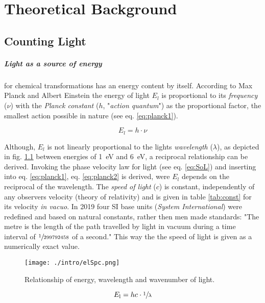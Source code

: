 \chapter{Theoretical Background}
	\section{Counting Light}
	\paragraph{Light as a source of energy} for chemical transformations has an energy content by itself. According to Max Planck and Albert Einstein the energy of light $E_l$ is proportional to its \emph{frequency} ($\nu$) with the \emph{Planck constant} ($h$, "\emph{action quantum}") as the proportional factor, the smallest action possible in nature (see eq. \ref{eq:planck1}). 

	\begin{equation}%
		\label{eq:planck1}
		E_l = h\cdot\nu
	\end{equation}

	Although, $E_l$ is not linearly proportional to the lights \emph{wavelength} ($\lambda$), as depicted in fig. \ref{fig:elSpc} between energies of \qty{1}{\eV} and \qty{6}{\eV}, a reciprocal relationship can be derived. Invoking the phase velocity law for light (see eq. \ref{eq:SoL}) and inserting into eq. \ref{eq:planck1}, eq. \ref{eq:planck2} is derived, were  $E_l$ depends on the reciprocal of the wavelength. The \emph{speed of light} ($c$) is constant, independently of any observers velocity (theory of relativity) and is given in table \ref{tab:const} for its velocity \textit{in vacuo}. In 2019 four SI base units (\textit{System International}) were redefined and based on natural constants, rather then men made standards: "The metre is the length of the path travelled by light in vacuum during a time interval of $\sfrac{1}{299792458}$ of a second." This way the the speed of light is given as a numerically exact value.

	\begin{figure}[h]%
		\centering
		\label{fig:elSpc}
		\texttt{[image: ./intro/elSpc.png]}
		\caption{Relationship of energy, wavelength and wavenumber of light.}
	\end{figure}

	\begin{equation}%
		\label{eq:planck2}
		E_\mathrm{l} = hc\cdot\sfrac{1}{\lambda}
	\end{equation}

